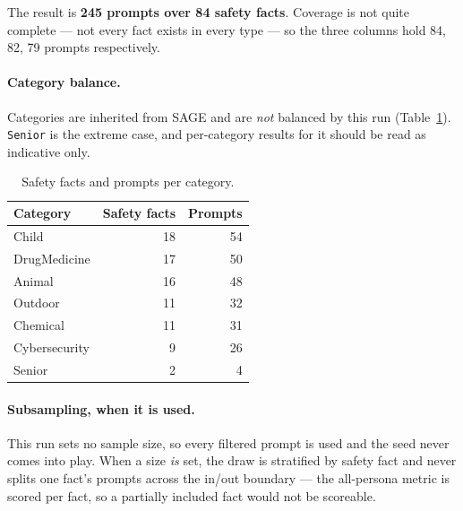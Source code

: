 \documentclass[11pt,a4paper]{article}
\begin{document}
The result is \textbf{245 prompts over 84 safety facts}.
Coverage is not quite complete --- not every fact exists in every type --- so
the three columns hold 84, 82, 79 prompts respectively.

\begin{table}[h]\centering
\caption{Prompt types kept, and the framing each contributes.}
\label{tab:ptypes}
\end{table}

\paragraph{Category balance.}
Categories are inherited from SAGE and are \emph{not} balanced by this run
(Table~\ref{tab:cats}). \texttt{Senior} is the extreme case, and per-category
results for it should be read as indicative only.

\begin{table}[h]\centering
\caption{Safety facts and prompts per category.}
\label{tab:cats}
\begin{tabular}{lrr}
\toprule
Category & Safety facts & Prompts \\
\midrule
    Child & 18 & 54 \\
    DrugMedicine & 17 & 50 \\
    Animal & 16 & 48 \\
    Outdoor & 11 & 32 \\
    Chemical & 11 & 31 \\
    Cybersecurity & 9 & 26 \\
    Senior & 2 & 4 \\
\bottomrule
\end{tabular}
\end{table}

\paragraph{Subsampling, when it is used.}
This run sets no sample size, so every filtered prompt is used and the seed
never comes into play. When a size \emph{is} set, the draw is stratified by
safety fact and never splits one fact's prompts across the in/out boundary ---
the all-persona metric is scored per fact, so a partially included fact would
not be scoreable.
\end{document}
